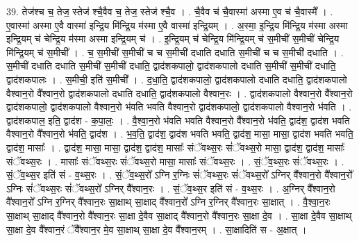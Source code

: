 \documentclass[17pt]{extarticle}
\begin{document}
39. तेज॑श्च च॒ तेज॒ स्तेज॑ श्चै॒वैव च॒ तेज॒ स्तेज॑ श्चै॒व । . चै॒वैव च॑ चै॒वास्मा॑ अस्मा ए॒व च॑ चै॒वास्मै᳚ । . ए॒वास्मा॑ अस्मा ए॒वै वास्मा॑ इन्द्रि॒य मि॑न्द्रि॒य म॑स्मा ए॒वै वास्मा॑ इन्द्रि॒यम् । . अ॒स्मा॒ इ॒न्द्रि॒य मि॑न्द्रि॒य म॑स्मा अस्मा इन्द्रि॒यम् च॑ चेन्द्रि॒य म॑स्मा अस्मा इन्द्रि॒यम् च॑ । . इ॒न्द्रि॒यम् च॑ चेन्द्रि॒य मि॑न्द्रि॒यम् च॑ स॒मीची॑ स॒मीची॑ चेन्द्रि॒य मि॑न्द्रि॒यम् च॑ स॒मीची᳚ । . च॒ स॒मीची॑ स॒मीची॑ च च स॒मीची॑ दधाति दधाति स॒मीची॑ च च स॒मीची॑ दधाति । . स॒मीची॑ दधाति दधाति स॒मीची॑ स॒मीची॑ दधाति॒ द्वाद॑शकपालो॒ द्वाद॑शकपालो दधाति स॒मीची॑ स॒मीची॑ दधाति॒ द्वाद॑शकपालः । . स॒मीची॒ इति॑ स॒मीची᳚ । . द॒धा॒ति॒ द्वाद॑शकपालो॒ द्वाद॑शकपालो दधाति दधाति॒ द्वाद॑शकपालो वैश्वान॒रो वै᳚श्वान॒रो द्वाद॑शकपालो दधाति दधाति॒ द्वाद॑शकपालो वैश्वान॒रः । . द्वाद॑शकपालो वैश्वान॒रो वै᳚श्वान॒रो द्वाद॑शकपालो॒ द्वाद॑शकपालो वैश्वान॒रो भ॑वति भवति वैश्वान॒रो द्वाद॑शकपालो॒ द्वाद॑शकपालो वैश्वान॒रो भ॑वति । . द्वाद॑शकपाल॒ इति॒ द्वाद॑श - क॒पा॒लः॒ । . वै॒श्वा॒न॒रो भ॑वति भवति वैश्वान॒रो वै᳚श्वान॒रो भ॑वति॒ द्वाद॑श॒ द्वाद॑श भवति वैश्वान॒रो वै᳚श्वान॒रो भ॑वति॒ द्वाद॑श । . भ॒व॒ति॒ द्वाद॑श॒ द्वाद॑श भवति भवति॒ द्वाद॑श॒ मासा॒ मासा॒ द्वाद॑श भवति भवति॒ द्वाद॑श॒ मासाः᳚ । . द्वाद॑श॒ मासा॒ मासा॒ द्वाद॑श॒ द्वाद॑श॒ मासाः᳚ संॅवथ्स॒रः सं॑ॅवथ्स॒रो मासा॒ द्वाद॑श॒ द्वाद॑श॒ मासाः᳚ संॅवथ्स॒रः । . मासाः᳚ संॅवथ्स॒रः सं॑ॅवथ्स॒रो मासा॒ मासाः᳚ संॅवथ्स॒रः । . सं॒ॅव॒थ्स॒रः सं॑ॅवथ्स॒रः । . सं॒ॅव॒थ्स॒र इति॑ सं - व॒थ्स॒रः । . सं॒ॅव॒थ्स॒रो᳚ ऽग्नि र॒ग्निः सं॑ॅवथ्स॒रः सं॑ॅवथ्स॒रो᳚ ऽग्निर् वै᳚श्वान॒रो वै᳚श्वान॒रो᳚ ऽग्निः सं॑ॅवथ्स॒रः सं॑ॅवथ्स॒रो᳚ ऽग्निर् वै᳚श्वान॒रः । . सं॒ॅव॒थ्स॒र इति॑ सं - व॒थ्स॒रः । . अ॒ग्निर् वै᳚श्वान॒रो वै᳚श्वान॒रो᳚ ऽग्नि र॒ग्निर् वै᳚श्वान॒रः सा॒क्षाथ् सा॒क्षाद् वै᳚श्वान॒रो᳚ ऽग्नि र॒ग्निर् वै᳚श्वान॒रः सा॒क्षात् । . वै॒श्वा॒न॒रः सा॒क्षाथ् सा॒क्षाद् वै᳚श्वान॒रो वै᳚श्वान॒रः सा॒क्षा दे॒वैव सा॒क्षाद् वै᳚श्वान॒रो वै᳚श्वान॒रः सा॒क्षा दे॒व । . सा॒क्षा दे॒वैव सा॒क्षाथ् सा॒क्षा दे॒व वै᳚श्वान॒रं ॅवै᳚श्वान॒र मे॒व सा॒क्षाथ् सा॒क्षा दे॒व वै᳚श्वान॒रम् । . सा॒क्षादिति॑ स - अ॒क्षात् । \newline
\pagebreak
{}
\end{document}
